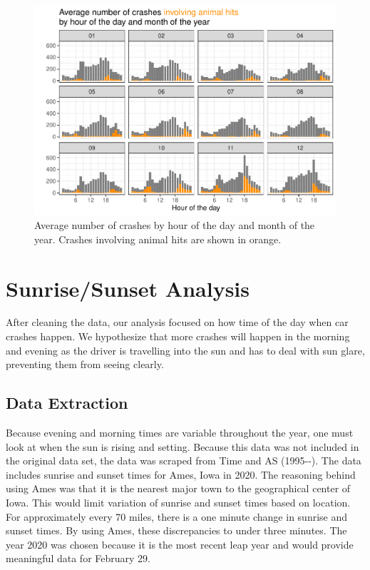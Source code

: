 \documentclass[conference,final,]{IEEEtran}
\begin{document}
\begin{figure}

{\centering \includegraphics[width=\columnwidth]{CAUSE_files/figure-latex/daytime-1} 

}

\caption{Average number of crashes by hour of the day and month of the year. Crashes involving animal hits are shown in orange. }\label{fig:daytime}
\end{figure}

\hypertarget{sunrisesunset-analysis}{%
\section{Sunrise/Sunset Analysis}\label{sunrisesunset-analysis}}

After cleaning the data, our analysis focused on how time of the day when car crashes happen. We hypothesize that more crashes will happen in the morning and evening as the driver is travelling into the sun and has to deal with sun glare, preventing them from seeing clearly.

\hypertarget{data-extraction}{%
\subsection{Data Extraction}\label{data-extraction}}

Because evening and morning times are variable throughout the year, one must look at when the sun is rising and setting. Because this data was not included in the original data set, the data was scraped from Time and AS (1995-\/-). The data includes sunrise and sunset times for Ames, Iowa in 2020. The reasoning behind using Ames was that it is the nearest major town to the geographical center of Iowa. This would limit variation of sunrise and sunset times based on location. For approximately every 70 miles, there is a one minute change in sunrise and sunset times. By using Ames, these discrepancies to under three minutes. The year 2020 was chosen because it is the most recent leap year and would provide meaningful data for February 29.
\end{document}
